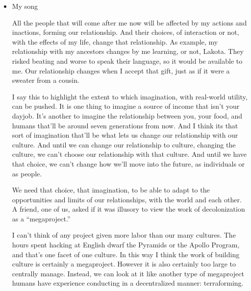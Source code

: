 \documentclass[11pt]{article}
\begin{document}
\begin{itemize}
\begin{itemize}
I don’t know what the future will look like. I don’t know what \#LandBack looks like. My imagination is more than full with today, trying to imagine things like what this settler means, really, when they say they “need a new car,” or what this bird means with its screams. I can, and will, share the illusions and truths as I see them, and the actions I take, but I don’t know if I can imagine the future, the way some of you all have asked.

And this against the grain of many contemporary futurists, with whom I’m sometimes grouped. It might even seem to place me with the Luddities, especially as I write this by hand feet away from a working computer and complain that maybe learning to speak killed culture. But I think that would be a mischaracterization. While I don’t imagine “the future,” I do keep in my mind my relatives, and that includes those related to me across time.
\item My song
\label{sec:org7ae15d6}

All the people that will come after me now will be affected by my actions and inactions, forming our relationship. And their choices, of interaction or not, with the effects of my life, change that relationship. As example, my relationship with my ancestors changes by me learning, or not, Lakota. They risked beating and worse to speak their language, so it would be available to me. Our relationship changes when I accept that gift, just as if it were a sweater from a cousin.

I say this to highlight the extent to which imagination, with real-world utility, can be pushed. It is one thing to imagine a source of income that isn’t your dayjob. It’s another to imagine the relationship between you, your food, and humans that’ll be around seven generations from now. And I think its that sort of imagination that’ll be what lets us change our relationship with our culture. And until we can change our relationship to culture, changing the culture, we can’t choose our relationship with that culture. And until we have that choice, we can’t change how we’ll move into the future, as individuals or as people.

We need that choice, that imagination, to be able to adapt to the opportunities and limits of our relationships, with the world and each other. A friend, one of us, asked if it was illusory to view the work of decolonization as a “megaproject.”

I can’t think of any project given more labor than our many cultures. The hours spent hacking at English dwarf the Pyramids or the Apollo Program, and that’s one facet of one culture. In this way I think the work of building culture is certainly a megaproject. However it is also certainly too large to centrally manage. Instead, we can look at it like another type of megaproject humans have experience conducting in a decentralized manner: terraforming.


\end{itemize}
\end{itemize}
\end{document}
